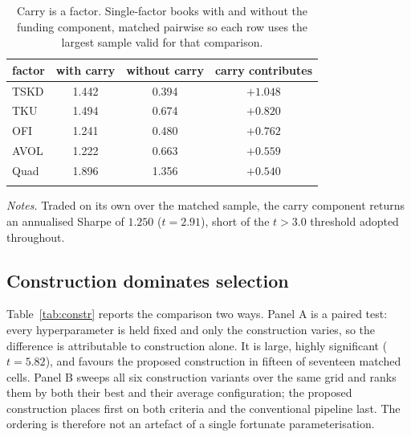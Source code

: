 \documentclass[11pt,letterpaper]{article}
\begin{document}
\begin{table}[!htbp]\centering
\caption{Carry is a factor. Single-factor books with and without the funding
component, matched pairwise so each row uses the largest sample valid for that
comparison.}\label{tab:carry}
\begin{tabular}{lccc}
\toprule
factor & with carry & without carry & carry contributes \\
\midrule\addlinespace[2pt]
TSKD & 1.442 & 0.394 & $+1.048$ \\
TKU & 1.494 & 0.674 & $+0.820$ \\
OFI & 1.241 & 0.480 & $+0.762$ \\
AVOL & 1.222 & 0.663 & $+0.559$ \\
Quad & 1.896 & 1.356 & $+0.540$ \\
\addlinespace[2pt]
\bottomrule
\end{tabular}

\vspace{4pt}
\begin{minipage}{0.80\textwidth}\footnotesize
\emph{Notes.} Traded on its own over the matched sample, the carry component
returns an annualised Sharpe of $1.250$ ($t=2.91$), short of the $t>3.0$
threshold adopted throughout.
\end{minipage}
\end{table}

\subsection{Construction dominates selection}

Table~\ref{tab:constr} reports the comparison two ways. Panel A is a paired test:
every hyperparameter is held fixed and only the construction varies, so the
difference is attributable to construction alone. It is large, highly significant
($t=5.82$), and favours the proposed construction in fifteen of seventeen matched
cells. Panel B sweeps all six construction variants over the same grid and ranks
them by both their best and their average configuration; the proposed
construction places first on both criteria and the conventional pipeline last.
The ordering is therefore not an artefact of a single fortunate parameterisation.
\end{document}
